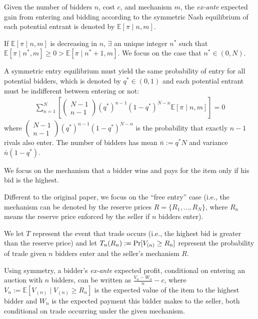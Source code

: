 \documentclass[11pt]{elegantbook_2}
\begin{document}
Given the number of bidders $n$, cost $c$, and mechanism $m$, the \textit{ex-ante} expected gain from entering and bidding according to the symmetric Nash equilibrium of each potential entrant is denoted by $\mathbb{E}[\pi\mid n,m]$.

If $\mathbb{E}[\pi\mid n,m]$ is decreasing in $n$, $\exists$ an unique integer $n^*$ such that $\mathbb{E}[\pi\mid n^*,m]\geq 0>\mathbb{E}[\pi\mid n^*+1,m]$. We focus on the case that $n^*\in (0,N)$.

A symmetric entry equilibrium must yield the same probability of entry for all potential bidders, which is denoted by $q^*\in (0,1)$ and each potential entrant must be indifferent between entering or not:
\begin{equation}
    \begin{aligned}
        \sum_{n=1}^N\left[
            \begin{pmatrix}
            N-1\\
            n-1
        \end{pmatrix}
        (q^*)^{n-1}(1-q^*)^{N-n}\mathbb{E}[\pi\mid n,m]
        \right]=0
    \end{aligned}
    \label{EAE_1}
\end{equation}
where $\begin{pmatrix}N-1\\n-1\end{pmatrix}(q^*)^{n-1}(1-q^*)^{N-n}$ is the probability that exactly $n-1$ rivals also enter. The number of bidders has mean $\bar{n}:=q^*N$ and variance $\bar{n}(1-q^*)$.

We focus on the mechanism that a bidder wins and pays for the item only if his bid is the highest.
\begin{note}
    Different to the original paper, we focus on the ``free entry'' case (i.e., the mechanism can be denoted by the reserve prices $R=\{R_1,...,R_N\}$, where $R_n$ means the reserve price enforced by the seller if $n$ bidders enter).
\end{note}
We let $T$ represent the event that trade occurs (i.e., the highest bid is greater than the reserve price) and let $T_n(R_n):=\textnormal{Pr}[V_{(n)}\geq R_n]$ represent the probability of trade given $n$ bidders enter and the seller's mechanism $R$.

Using symmetry, a bidder's \textit{ex-ante} expected profit, conditional on entering an auction with $n$ bidders, can be written as $\frac{V_n-W_n}{n}-c$, where $V_n:=\mathbb{E}[V_{(n)}\mid V_{(n)}\geq R_n]$ is the expected value of the item to the highest bidder and $W_n$ is the expected payment this bidder makes to the seller, both conditional on trade occurring under the given mechanism.
\end{document}
